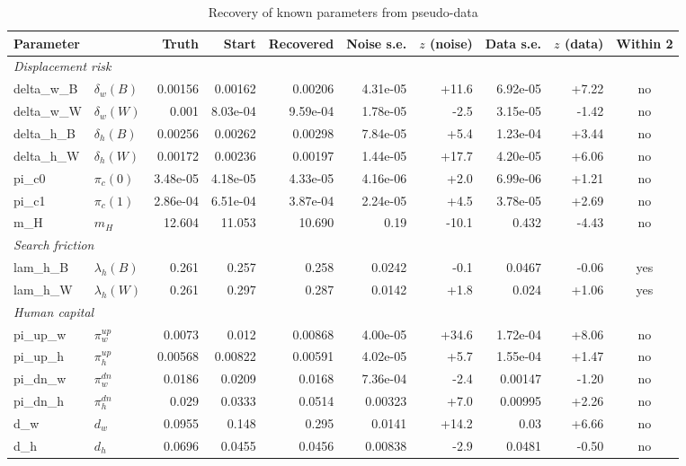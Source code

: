\begin{table}[htbp]\centering\footnotesize
\caption{Recovery of known parameters from pseudo-data}\label{tab:recovery}
\begin{tabular}{llrrrrrrrc}
\toprule
Parameter & & Truth & Start & Recovered & Noise s.e. & $z$ (noise) & Data s.e. & $z$ (data) & Within 2 \\
\midrule
\multicolumn{10}{l}{\textit{Displacement risk}} \\
delta\_w\_B & $\delta_w(B)$ & 0.00156 & 0.00162 & 0.00206 & 4.31e-05 & +11.6 & 6.92e-05 & +7.22 & no \\
delta\_w\_W & $\delta_w(W)$ & 0.001 & 8.03e-04 & 9.59e-04 & 1.78e-05 & -2.5 & 3.15e-05 & -1.42 & no \\
delta\_h\_B & $\delta_h(B)$ & 0.00256 & 0.00262 & 0.00298 & 7.84e-05 & +5.4 & 1.23e-04 & +3.44 & no \\
delta\_h\_W & $\delta_h(W)$ & 0.00172 & 0.00236 & 0.00197 & 1.44e-05 & +17.7 & 4.20e-05 & +6.06 & no \\
pi\_c0 & $\pi_c(0)$ & 3.48e-05 & 4.18e-05 & 4.33e-05 & 4.16e-06 & +2.0 & 6.99e-06 & +1.21 & no \\
pi\_c1 & $\pi_c(1)$ & 2.86e-04 & 6.51e-04 & 3.87e-04 & 2.24e-05 & +4.5 & 3.78e-05 & +2.69 & no \\
m\_H & $m_H$ & 12.604 & 11.053 & 10.690 & 0.19 & -10.1 & 0.432 & -4.43 & no \\
\multicolumn{10}{l}{\textit{Search friction}} \\
lam\_h\_B & $\lambda_h(B)$ & 0.261 & 0.257 & 0.258 & 0.0242 & -0.1 & 0.0467 & -0.06 & yes \\
lam\_h\_W & $\lambda_h(W)$ & 0.261 & 0.297 & 0.287 & 0.0142 & +1.8 & 0.024 & +1.06 & yes \\
\multicolumn{10}{l}{\textit{Human capital}} \\
pi\_up\_w & $\pi^{up}_w$ & 0.0073 & 0.012 & 0.00868 & 4.00e-05 & +34.6 & 1.72e-04 & +8.06 & no \\
pi\_up\_h & $\pi^{up}_h$ & 0.00568 & 0.00822 & 0.00591 & 4.02e-05 & +5.7 & 1.55e-04 & +1.47 & no \\
pi\_dn\_w & $\pi^{dn}_w$ & 0.0186 & 0.0209 & 0.0168 & 7.36e-04 & -2.4 & 0.00147 & -1.20 & no \\
pi\_dn\_h & $\pi^{dn}_h$ & 0.029 & 0.0333 & 0.0514 & 0.00323 & +7.0 & 0.00995 & +2.26 & no \\
d\_w & $d_w$ & 0.0955 & 0.148 & 0.295 & 0.0141 & +14.2 & 0.03 & +6.66 & no \\
d\_h & $d_h$ & 0.0696 & 0.0455 & 0.0456 & 0.00838 & -2.9 & 0.0481 & -0.50 & no \\

\end{tabular}
\end{table}
